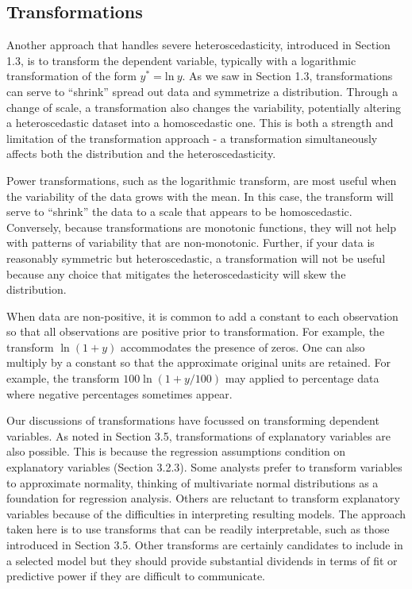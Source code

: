 \subsection{Transformations}\label{S5:Transformations}

Another approach that handles severe heteroscedasticity, introduced
in Section 1.3, is to transform the dependent variable, typically
with a logarithmic transformation of the form $y^{\ast} =
\mathrm{ln~}y$. As we saw in Section 1.3, transformations can serve
to ``shrink'' spread out data and symmetrize a distribution. Through
a change of scale, a transformation also changes the variability,
potentially altering a heteroscedastic dataset into a homoscedastic
one. This is both a strength and limitation of the transformation
approach - a transformation simultaneously affects both the
distribution and the heteroscedasticity.


Power transformations, such as the logarithmic transform, are most
useful when the variability of the data grows with the mean. In this
case, the transform will serve to ``shrink'' the data to a scale
that appears to be homoscedastic. Conversely, because
transformations are monotonic functions, they will not help with
patterns of variability that are non-monotonic. Further, if your
data is reasonably symmetric but heteroscedastic, a transformation
will not be useful because any choice that mitigates the
heteroscedasticity will skew the distribution.

When data are non-positive, it is common to add a constant to each
observation so that all observations are positive prior to
transformation. For example, the transform $\ln (1+y)$ accommodates
the presence of zeros. One can also multiply by a constant so that
the approximate original units are retained. For example, the
transform $100\ln (1+y/100)$ may applied to percentage data where
negative percentages sometimes appear.

Our discussions of transformations have focussed on transforming
dependent variables. As noted in Section 3.5, transformations of
explanatory variables are also possible. This is because the
regression assumptions condition on explanatory variables (Section
3.2.3). Some analysts prefer to transform variables to approximate
normality, thinking of multivariate normal distributions as a
foundation for regression analysis. Others are reluctant to
transform explanatory variables because of the difficulties in
interpreting resulting models. The approach taken here is to use
transforms that can be readily interpretable, such as those
introduced in Section 3.5. Other transforms are certainly candidates
to include in a selected model but they should provide substantial
dividends in terms of fit or predictive power if they are difficult
to communicate.


